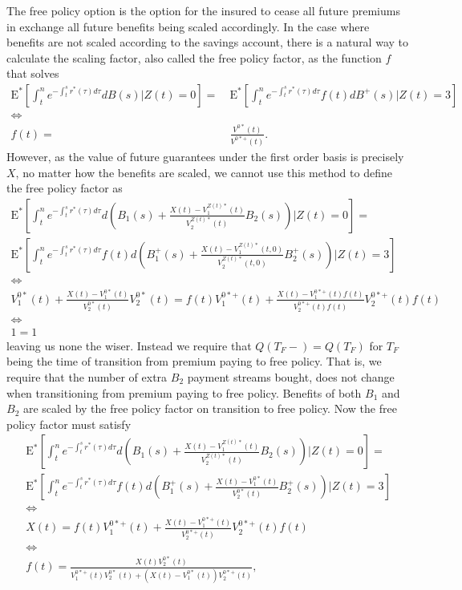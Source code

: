 \documentclass[12pt]{article}
\newcommand{\E}{\text{E}}
\theoremstyle{my_thm}
\theoremstyle{my_rem}
\begin{document}
The free policy option is the option for the insured to cease all future premiums in exchange all future benefits being scaled accordingly. In the case where benefits are not scaled according to the savings account, there is a natural way to calculate the scaling factor, also called the free policy factor, as the function $f$ that solves
\begin{align*}
\E^* \left[ \int_t^n e^{-\int_t^s r^*(\tau) d\tau} dB(s)|Z(t)=0 \right]
= \ &\E^* \left[ \int_t^n e^{-\int_t^s r^*(\tau) d\tau} f(t) dB^+(s)|Z(t)=3 \right]
\\
\Leftrightarrow&
\\
f(t)= \ &\frac{V^{0*}(t)}{V^{0*+}(t)}.
\end{align*}
However, as the value of future guarantees under the first order basis is precisely $X$, no matter how the benefits are scaled, we cannot use this method to define the free policy factor as
\begin{gather*}
\E^* \left[ \int_t^n e^{-\int_t^s r^*(\tau) d\tau} d \left( B_1(s)+\frac{X(t)-V_1^{Z(t)*}(t)}{V_2^{Z(t)*}(t)}B_2(s) \right) |Z(t)=0 \right]
=
\\
\E^* \left[ \int_t^n e^{-\int_t^s r^*(\tau) d\tau} f(t) d \left( B_1^+(s)+\frac{X(t)-V_1^{Z(t)*}(t,0)}{V_2^{Z(t)*}(t,0)}B_2^+(s) \right) |Z(t)=3 \right]
\\
\Leftrightarrow
\\
V_1^{0*}(t)+ \frac{X(t)-V_1^{0*}(t)}{V_2^{0*}(t)}V_2^{0*}(t)
=
f(t)V_1^{0*+}(t)+ \frac{X(t)-V_1^{0*+}(t)f(t)}{V_2^{0*+}(t)f(t)}V_2^{0*+}(t)f(t)
\\
 \Leftrightarrow
\\
1=1
\end{gather*}
leaving us none the wiser. Instead we require that $Q(T_F-)=Q(T_F)$ for $T_F$ being the time of transition from premium paying to free policy. That is, we require that the number of extra $B_2$ payment streams bought, does not change when transitioning from premium paying to free policy. Benefits of both $B_1$ and $B_2$ are scaled by the free policy factor on transition to free policy. Now the free policy factor must satisfy
\begin{gather*}
\E^* \left[ \int_t^n e^{-\int_t^s r^*(\tau) d\tau} d \left( B_1(s)+\frac{X(t)-V_1^{Z(t)*}(t)}{V_2^{Z(t)*}(t)}B_2(s) \right) |Z(t)=0 \right]
=
\\
\E^* \left[ \int_t^n e^{-\int_t^s r^*(\tau) d\tau} f(t) d \left( B_1^+(s)+\frac{X(t)-V_1^{0*}(t)}{V_2^{0*}(t)}B_2^+(s) \right) |Z(t)=3 \right]
\\
\Leftrightarrow
\\
X(t)
=
f(t)V_1^{0*+}(t)+ \frac{X(t)-V_1^{0*+}(t)}{V_2^{0*+}(t)}V_2^{0*+}(t)f(t)
\\
\Leftrightarrow
\\
f(t)=\frac{X(t)V_2^{0*}(t)}{V_1^{0*+}(t)V_2^{0*}(t)+(X(t)-V_1^{0*}(t))V_2^{0*+}(t)},
\end{gather*}
\end{document}
